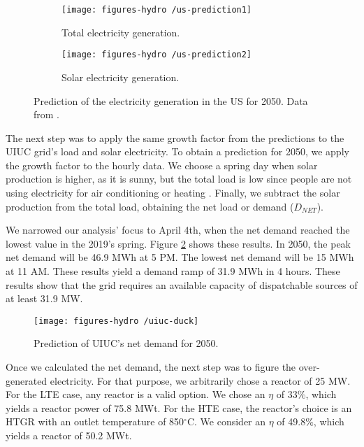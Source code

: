 \documentclass[11pt,letterpaper]{article}
\begin{document}
\begin{figure}[htbp!]
	\centering
	\begin{subfigure}[t]{0.38\textwidth}
		\centering
		\texttt{[image: figures-hydro /us-prediction1]}
		\caption{Total electricity generation.}
	\end{subfigure}
	\begin{subfigure}[t]{0.40\textwidth}
		\centering
		\texttt{[image: figures-hydro /us-prediction2]}
		\caption{Solar electricity generation.}
	\end{subfigure}
	\hfill
	\caption{Prediction of the electricity generation in the \gls{US} for 2050. Data from \cite{us_energy_information_administration_electric_2020}.}
	\label{fig:prediction}
\end{figure}

The next step was to apply the same growth factor from the predictions to the \gls{UIUC} grid's load and solar electricity.
To obtain a prediction for 2050, we apply the growth factor to the hourly data.
We choose a spring day when solar production is higher, as it is sunny, but the total load is low since people are not using electricity for air conditioning or heating \cite{us_department_of_energy_confronting_2017}.
Finally, we subtract the solar production from the total load, obtaining the net load or demand ($D_{NET}$).

We narrowed our analysis' focus to April 4th, when the net demand reached the lowest value in the 2019's spring.
Figure \ref{fig:uiuc-duck1} shows these results.
In 2050, the peak net demand will be 46.9 MWh at 5 PM.
The lowest net demand will be 15 MWh at 11 AM.
These results yield a demand ramp of 31.9 MWh in 4 hours.
These results show that the grid requires an available capacity of dispatchable sources of at least 31.9 MW.

\begin{figure}[htbp!]
		\centering
	\texttt{[image: figures-hydro /uiuc-duck]}
	\hfill
	\caption{Prediction of \gls{UIUC}'s net demand for 2050.}
	\label{fig:uiuc-duck1}
\end{figure}

Once we calculated the net demand, the next step was to figure the over-generated electricity.
For that purpose, we arbitrarily chose a reactor of 25 MW.
For the \gls{LTE} case, any reactor is a valid option.
We chose an $\eta$ of 33$\%$, which yields a reactor power of 75.8 MWt.
For the \gls{HTE} case, the reactor's choice is an HTGR with an outlet temperature of 850$^{\circ}$C.
We consider an $\eta$ of 49.8$\%$, which yields a reactor of 50.2 MWt.
\end{document}
